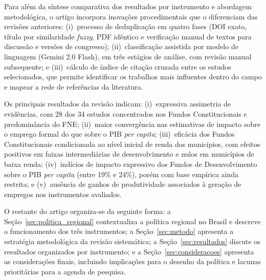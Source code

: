 Para além da síntese comparativa dos resultados por instrumento e abordagem metodológica, o artigo incorpora inovações procedimentais que o diferenciam das revisões anteriores: (i)~processo de deduplicação em quatro fases (DOI exato, título por similaridade \textit{fuzzy}, PDF idêntico e verificação manual de textos para discussão e versões de congresso); (ii)~classificação assistida por modelo de linguagem (Gemini 2.0 Flash), em três estágios de análise, com revisão manual subsequente; e (iii)~cálculo de índice de citação cruzada entre os estudos selecionados, que permite identificar os trabalhos mais influentes dentro do campo e mapear a rede de referências da literatura.

Os principais resultados da revisão indicam: (i)~expressiva assimetria de evidências, com 28 dos 34 estudos concentrados nos Fundos Constitucionais e predominância do FNE; (ii)~maior convergência nas estimativas de impacto sobre o emprego formal do que sobre o PIB \textit{per capita}; (iii)~eficácia dos Fundos Constitucionais condicionada ao nível inicial de renda dos municípios, com efeitos positivos em faixas intermediárias de desenvolvimento e nulos em municípios de baixa renda; (iv)~indícios de impacto expressivo dos Fundos de Desenvolvimento sobre o PIB \textit{per capita} (entre 19\% e 24\%), porém com base empírica ainda restrita; e (v)~ausência de ganhos de produtividade associados à geração de empregos nos instrumentos avaliados.

O restante do artigo organiza-se da seguinte forma: a Seção~\ref{sec:politica_regional} contextualiza a política regional no Brasil e descreve o funcionamento dos três instrumentos; a Seção~\ref{sec:metodo} apresenta a estratégia metodológica da revisão sistemática; a Seção~\ref{sec:resultados} discute os resultados organizados por instrumento; e a Seção~\ref{sec:consideracoes} apresenta as considerações finais, incluindo implicações para o desenho da política e lacunas prioritárias para a agenda de pesquisa.
